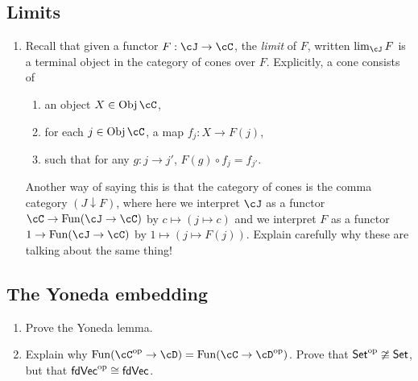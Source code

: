 \documentclass[12pt]{amsart}
\begin{document}
\subsection{Limits}
\begin{enumerate}
\item
Recall that given a functor $F : \cJ \to \cC$, the \emph{limit} of $F$, written $\lim_\cJ F$ is a terminal object in the category of cones over $F$. Explicitly, a cone consists of
\begin{enumerate}
	\item an object $X \in \Obj\cC$,
	\item for each $j \in \Obj\cC$, a map $f_j : X \to F(j)$,
	\item such that for any $g:j \to j'$, $F(g) \circ f_j = f_{j'}$.
\end{enumerate}
Another way of saying this is that the category of cones is the comma category $(J \downarrow F)$, where here we interpret $\cJ$ as a functor $\cC \to \Fun(\cJ \to \cC)$ by $c \mapsto (j \mapsto c)$ and we interpret $F$ as a functor $1 \to \Fun(\cJ \to \cC)$ by $1 \mapsto (j \mapsto F(j))$. Explain carefully why these are talking about the same thing!
\end{enumerate}


\subsection{The Yoneda embedding}
\begin{enumerate}
\item Prove the Yoneda lemma.
\item Explain why $\Fun(\cC^\text{op} \to \cD) = \Fun(\cC \to \cD^\text{op})$. Prove that $\mathsf{Set}^\text{op} \ncong \mathsf{Set}$, but that $\mathsf{fdVec}^\text{op} \cong \mathsf{fdVec}$.
\end{enumerate}

\newpage
\end{document}
